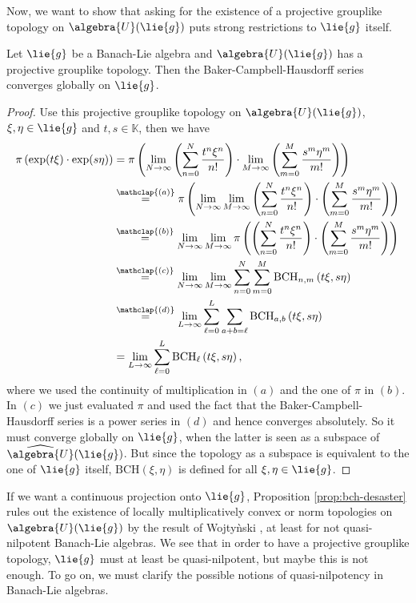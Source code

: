 \documentclass[
11pt,                          %
english                        %
]{article}
\newcommand{\bch}[2]{\mathrm{BCH}\left(#1, #2\right)}
\newcommand{\bchpart}[3]{\mathrm{BCH}_{#1}\left(#2, #3\right)}
\newcommand{\bchparts}[4]{\mathrm{BCH}_{#1, #2}\left(#3, #4\right)}
\newcommand\ot[2]{\stackrel{\mathclap{#1}}{#2}}
\begin{document}
Now, we want to show that asking for the existence of a projective grouplike topology 
on $\algebra{U}(\lie{g})$ puts strong restrictions to $\lie{g}$ itself.
\begin{proposition}
	\label{prop:bch-desaster}
	Let $\lie{g}$ be a Banach-Lie algebra and $\algebra{U}(\lie{g})$ has a projective 
	grouplike topology. Then the Baker-Campbell-Hausdorff series converges globally 
	on $\lie{g}$.
\end{proposition}
\begin{proof}
	Use this projective grouplike topology on $\algebra{U}(\lie{g})$, $\xi, \eta \in 
	\lie{g}$ and $t,s \in \mathbb{K}$, then we have
	\begin{align*}
		\pi \left( \exp(t \xi) \cdot \exp(s \eta) \right)
		& =
		\pi
		\left(
			\lim_{N \rightarrow \infty}
			\left(
				\sum\limits_{n=0}^N
				\frac{t^n \xi^n}{n!}
			\right)
			\cdot
			\lim_{M \rightarrow \infty}
			\left(
				\sum\limits_{m=0}^M
				\frac{s^m \eta^m}{m!}
			\right)
		\right)
		\\
		& \ot{(a)}{=}
		\pi
		\left(
			\lim_{N \rightarrow \infty}
			\lim_{M \rightarrow \infty}
			\left(
				\sum\limits_{n=0}^N
				\frac{t^n \xi^n}{n!}
			\right)
			\cdot
			\left(
				\sum\limits_{m=0}^M
				\frac{s^m \eta^m}{m!}
			\right)
		\right)
		\\
		& \ot{(b)}{=}
		\lim_{N \rightarrow \infty}
		\lim_{M \rightarrow \infty}
		\pi
		\left(	
			\left(
				\sum\limits_{n=0}^N
				\frac{t^n \xi^n}{n!}
			\right)
			\cdot
			\left(
				\sum\limits_{m=0}^M
				\frac{s^m \eta^m}{m!}
			\right)
		\right)
		\\
		& \ot{(c)}{=}
		\lim_{N \rightarrow \infty}
		\lim_{M \rightarrow \infty}
		\sum\limits_{n=0}^{N}
		\sum\limits_{m=0}^{M}
		\bchparts{n}{m}{t \xi}{s \eta}
		\\
		& \ot{(d)}{=}
		\lim_{L \rightarrow \infty}
		\sum\limits_{\ell=0}^{L}
		\sum\limits_{a + b = \ell}
		\bchparts{a}{b}{t \xi}{s \eta}
		\\
		& =
		\lim_{L \rightarrow \infty}
		\sum\limits_{\ell=0}^{L}
		\bchpart{\ell}{t \xi}{s \eta},
	\end{align*}
	where we used the continuity of multiplication in $(a)$ and the one of $\pi$ in 
	$(b)$. In $(c)$ we just evaluated $\pi$ and used the fact that the 
	Baker-Campbell-Hausdorff series is a power series in $(d)$ and hence converges 
	absolutely. So it must converge globally on $\lie{g}$, when the latter is seen 
	as a subspace of $\widehat{\algebra{U}}(\lie{g})$. But since the topology as a 
	subspace is equivalent to the one of $\lie{g}$ itself, $\bch{\xi}{\eta}$ is 
	defined for all $\xi, \eta \in \lie{g}$.
\end{proof}
If we want a continuous projection onto $\lie{g}$, Proposition 
\ref{prop:bch-desaster} rules out the existence of locally multiplicatively convex or 
norm topologies on $\algebra{U}(\lie{g})$ by the result of Wojty{\`n}ski 
\cite{wojtynski:1998a}, at least for not quasi-nilpotent Banach-Lie algebras. We see 
that in order to have a projective grouplike topology, $\lie{g}$ must at least be 
quasi-nilpotent, but maybe this is not enough. To go on, we must clarify the possible 
notions of quasi-nilpotency in Banach-Lie algebras. 
\end{document}
